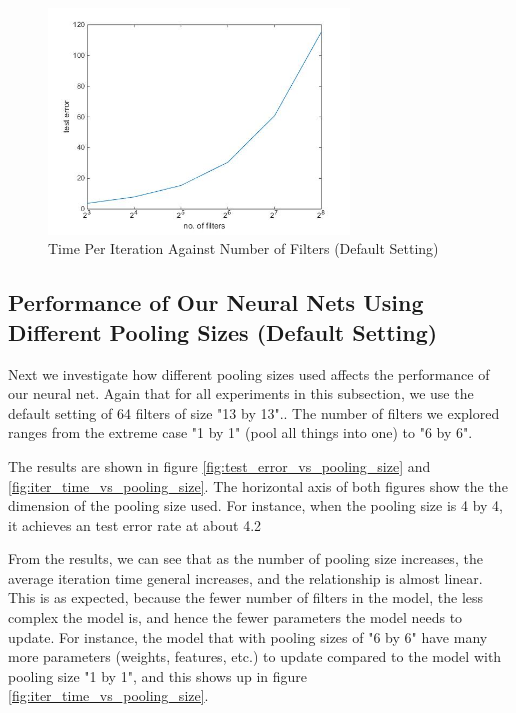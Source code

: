 \documentclass[10pt,twocolumn]{article}
\begin{document}
\begin{figure}
\centering
\includegraphics[width = 8cm]{figure/iter_time_vs_no_of_filters}
\caption{Time Per Iteration Against Number of Filters (Default Setting)}
\label{fig:iter_time_vs_no_of_filters}
\end{figure}

\FloatBarrier

\subsection{Performance of Our Neural Nets Using Different Pooling Sizes (Default Setting)}

Next we investigate how different pooling sizes used affects the performance of our neural net. Again that for all experiments in this subsection, we use the default setting of 64 filters of size "13 by 13".. The number of filters we explored ranges from the extreme case "1 by 1" (pool all things into one) to "6 by 6".

The results are shown in figure \ref{fig:test_error_vs_pooling_size} and \ref{fig:iter_time_vs_pooling_size}. The horizontal axis of both figures show the the dimension of the pooling size used. For instance, when the pooling size is 4 by 4, it achieves an test error rate at about 4.2%

From the results, we can see that as the number of pooling size increases, the average iteration time general increases, and the relationship is almost linear. This is as expected, because the fewer number of filters in the model, the less complex the model is, and hence the fewer parameters the model needs to update. For instance, the model that with pooling sizes of "6 by 6" have many more parameters (weights, features, etc.) to update compared to the model with pooling size "1 by 1", and this shows up in figure \ref{fig:iter_time_vs_pooling_size}.
\end{document}
